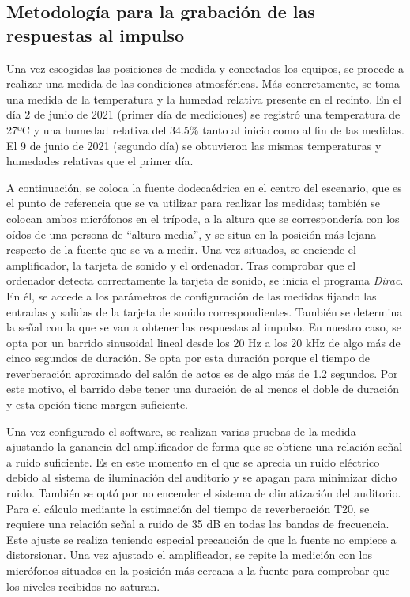 \documentclass[11pt,a4paper]{book}
\begin{document}
        \subsection{Metodología para la grabación de las respuestas al impulso}
            Una vez escogidas las posiciones de medida y conectados los equipos, se procede a realizar una medida de las condiciones atmosféricas. Más concretamente, se toma una medida de la temperatura y la humedad relativa presente en el recinto. En el día 2 de junio de 2021 (primer día de mediciones) se registró una temperatura de 27ºC y una humedad relativa del 34.5\% tanto al inicio como al fin de las medidas. El 9 de junio de 2021 (segundo día) se obtuvieron las mismas temperaturas y humedades relativas que el primer día.
        
            A continuación, se coloca la fuente dodecaédrica en el centro del escenario, que es el punto de referencia que se va utilizar para realizar las medidas; también se colocan ambos micrófonos en el trípode, a la altura que se correspondería con los oídos de una persona de ``altura media'', y se situa en la posición más lejana respecto de la fuente que se va a medir. Una vez situados, se enciende el amplificador, la tarjeta de sonido y el ordenador. Tras comprobar que el ordenador detecta correctamente la tarjeta de sonido, se inicia el programa \textit{Dirac}. En él, se accede a los parámetros de configuración de las medidas fijando las entradas y salidas de la tarjeta de sonido correspondientes. También se determina la señal con la que se van a obtener las respuestas al impulso. En nuestro caso, se opta por un barrido sinusoidal lineal desde los 20 Hz a los 20 kHz de algo más de cinco segundos de duración. Se opta por esta duración porque el tiempo de reverberación aproximado del salón de actos es de algo más de 1.2 segundos. Por este motivo, el barrido debe tener una duración de al menos el doble de duración y esta opción tiene margen suficiente.
        
            Una vez configurado el software, se realizan varias pruebas de la medida ajustando la ganancia del amplificador de forma que se obtiene una relación señal a ruido suficiente. Es en este momento en el que se aprecia un ruido eléctrico debido al sistema de iluminación del auditorio y se apagan para minimizar dicho ruido. También se optó por no encender el sistema de climatización del auditorio. Para el cálculo mediante la estimación del tiempo de reverberación T20, se requiere una relación señal a ruido de 35 dB en todas las bandas de frecuencia. Este ajuste se realiza teniendo especial precaución de que la fuente no empiece a distorsionar. Una vez ajustado el amplificador, se repite la medición con los micrófonos situados en la posición más cercana a la fuente para comprobar que los niveles recibidos no saturan.
        
\end{document}
